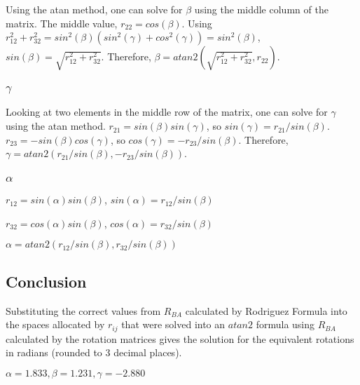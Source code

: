 \documentclass[12pt, letterpaper, oneside, notitlepage, onecolumn]{article}
\begin{document}
Using the atan method, one can solve for $\beta$ using the middle column of the matrix. The middle value, $r_{22} = cos(\beta)$. Using $r_{12}^{2} + r_{32}^{2} = sin^{2}(\beta)(sin^{2}(\gamma) + cos^{2}(\gamma)) = sin^{2}(\beta)$, $sin(\beta) = \sqrt{r_{12}^{2} + r_{32}^{2}}$. Therefore, $\beta = atan2(\sqrt{r_{12}^{2} + r_{32}^{2}}, r_{22})$.

\subsubsection{$\gamma$}

Looking at two elements in the middle row of the matrix, one can solve for $\gamma$ using the atan method. $r_{21} = sin(\beta) sin(\gamma)$, so $sin(\gamma) = r_{21} / sin(\beta)$. $r_{23} = -sin(\beta) cos(\gamma)$, so $cos(\gamma) = -r_{23} / sin(\beta)$. Therefore, $\gamma = atan2(r_{21} / sin(\beta), -r_{23} / sin(\beta))$.

\subsubsection{$\alpha$}

$r_{12} = sin(\alpha) sin(\beta)$, $sin(\alpha) = r_{12} / sin(\beta)$

$r_{32} = cos(\alpha) sin(\beta)$, $cos(\alpha) = r_{32} / sin(\beta)$

$\alpha = atan2(r_{12} / sin(\beta), r_{32} / sin(\beta))$

\subsection{Conclusion}

Substituting the correct values from $R_{BA}$ calculated by Rodriguez Formula into the spaces allocated by $r_{ij}$ that were solved into an $atan2$ formula using $R_{BA}$ calculated by the rotation matrices gives the solution for the equivalent rotations in radians (rounded to 3 decimal places).

$\alpha = 1.833, \beta = 1.231, \gamma = -2.880$
\end{document}
